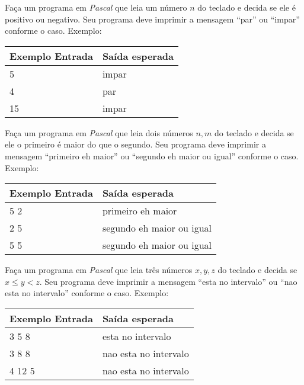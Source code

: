 
\item Faça um programa em \emph{Pascal} que leia um número $n$ do teclado
e decida se ele é positivo ou negativo. Seu programa deve imprimir
a mensagem ``par'' ou ``impar'' conforme o caso. Exemplo:

\begin{center}
\begin{tabular}{|l|l|} \hline
Exemplo Entrada & Saída esperada \\ \hline
5                & impar         \\ \hline
4                & par           \\ \hline
15               & impar         \\ \hline
\end{tabular}
\end{center}

\item Faça um programa em \emph{Pascal} que leia dois números $n, m$ do teclado
e decida se ele o primeiro é maior do que o segundo. Seu programa deve imprimir
a mensagem ``primeiro eh maior'' ou ``segundo eh maior ou igual'' conforme o caso. Exemplo:

\begin{center}
\begin{tabular}{|l|l|} \hline
Exemplo Entrada & Saída esperada \\ \hline
5 2             & primeiro eh maior               \\ \hline
2 5             & segundo eh maior ou igual       \\ \hline
5 5             & segundo eh maior ou igual       \\ \hline
\end{tabular}
\end{center}

\item Faça um programa em \emph{Pascal} que leia três números $x, y, z$ 
do teclado e decida se $x \le y < z$. 
Seu programa deve imprimir a mensagem ``esta no intervalo'' 
ou ``nao esta no intervalo'' conforme o caso. Exemplo:

\begin{center}
\begin{tabular}{|l|l|} \hline
Exemplo Entrada & Saída esperada \\ \hline
3 5 8           & esta no intervalo \\ \hline
3 8 8           & nao esta no intervalo \\ \hline
4 12 5          & nao esta no intervalo \\ \hline
\end{tabular}
\end{center}

